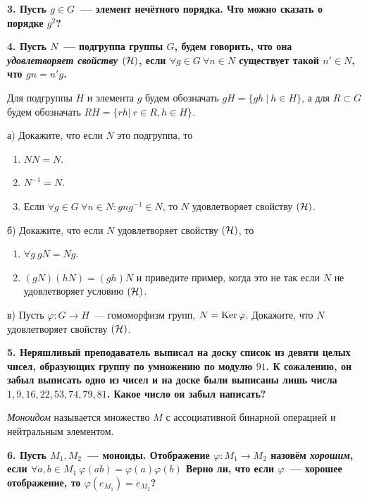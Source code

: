 \documentclass[12pt, oneside, dvipsnames]{extarticle}
\begin{document}
	\bf{3.} Пусть $g \in G$~--- элемент нечётного порядка. Что можно сказать о порядке $g^2$?

	 \bf{4.}  Пусть $N$~--- подгруппа группы $G$, будем говорить, что она \emph{удовлетворяет свойству $(\mathcal{H})$}, если $\forall g \in G \ \forall n \in N$ существует такой $n' \in N$, что $gn = n'g$.

	Для подгруппы $H$ и элемента $g$ будем обозначать $g H = \{ gh \ \vert \ h \in H \}$, а для $R \subset G$ будем обозначать $RH = \{ r h \vert \ r \in R, h \in H \}$.

	а) Докажите, что если $N$ это подгруппа, то
	\vspace{-2mm}
	\begin{enumerate}
		\item $NN = N$. 
		\item $N^{-1} = N$. 
		\item Если $\forall g\in G\  \forall n \in N\colon g n g^{-1} \in N$, то $N$ удовлетворяет свойству $(\mathcal{H})$.
	\end{enumerate}

	б) Докажите, что если $N$ удовлетворяет свойству $(\mathcal{H})$, то
	\vspace{-2mm}
	\begin{enumerate}
		\item $\forall g \ gN = Ng$.
		\item $(gN)(hN) = (gh)N$ и приведите пример, когда это не так если $N$ не удовлетворяет условию $(\mathcal{H})$.
	\end{enumerate}

	в) Пусть $\varphi \colon G \to H$~--- гомоморфизм групп, $N = \operatorname{Ker}{\varphi}$. Докажите, что $N$ удовлетворяет свойству $(\mathcal{H})$.

	\bf{5.} Неряшливый преподаватель выписал на доску список из девяти целых чисел, образующих группу по умножению по модулю $91$. К сожалению, он забыл выписать одно из чисел и на доске были выписаны лишь числа $1, 9, 16, 22, 53, 74, 79, 81$. Какое число он забыл написать? 

	\begin{definition} 
		\emph{Моноидом} называется множество $M$ с ассоциативной бинарной операцией и нейтральным элементом.   
	\end{definition}

	\bf{6.} Пусть $M_1, M_2$~--- моноиды. Отображение $\varphi \colon M_1 \to M_2$ назовём \emph{хорошим}, если $\forall a, b \in M_1 \ \varphi(ab) = \varphi(a) \varphi(b)$
	  Верно ли, что если $\varphi$~--- хорошее отображение, то $\varphi(e_{M_1}) = e_{M_2}$?
\end{document}
